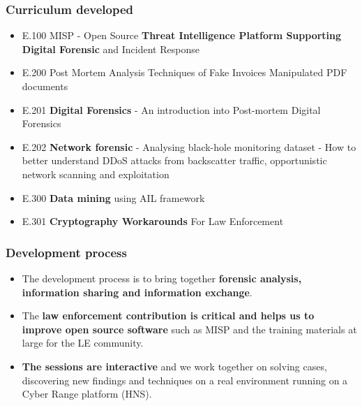 
\begin{frame}[t,plain]
\titlepage
\end{frame}

\begin{frame}
        \frametitle{Curriculum developed}
\begin{itemize}
\item E.100 MISP - Open Source {\bf Threat Intelligence Platform Supporting Digital Forensic} and Incident Response
\item E.200 Post Mortem Analysis Techniques of Fake Invoices Manipulated PDF documents
\item E.201 {\bf Digital Forensics} - An introduction into Post-mortem Digital Forensics
\item E.202 {\bf Network forensic} - Analysing black-hole monitoring dataset - How to better understand DDoS attacks from backscatter traffic, opportunistic network scanning and exploitation
\item E.300 {\bf Data mining} using AIL framework
\item E.301 {\bf Cryptography Workarounds} For Law Enforcement
\end{itemize}
\end{frame}

\begin{frame}
        \frametitle{Development process}
        \begin{itemize}
                \item The development process is to bring together {\bf forensic analysis, information sharing and information exchange}.
                \item The {\bf law enforcement contribution is critical and helps us to improve open source software} such as MISP and the training materials at large for the LE community.
                \item {\bf The sessions are interactive} and we work together on solving cases, discovering new findings and techniques on a real environment running on a Cyber Range platform (HNS).
        \end{itemize}
\end{frame}


